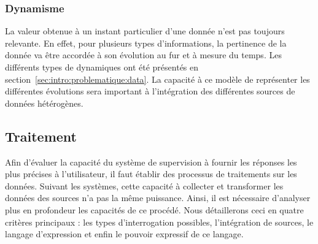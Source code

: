 \subsubsection{Dynamisme}
La valeur obtenue à un instant particulier d'une donnée n'est pas toujours relevante. En effet, pour plusieurs types d'informations, la pertinence de la donnée va être accordée à son évolution au fur et à mesure du temps. Les différents types de dynamiques ont été présentés en section~\ref{sec:intro:problematique:data}. La capacité à ce modèle de représenter les différentes évolutions sera important à l'intégration des différentes sources de données hétérogènes.

\subsection{Traitement}\label{sec:rw:supervision:criteres:traitement}
Afin d'évaluer la capacité du système de supervision à fournir les réponses les plus précises à l'utilisateur, il faut établir des processus de traitements sur les données. Suivant les systèmes, cette capacité à collecter et transformer les données des sources n'a pas la même puissance. Ainsi, il est nécessaire d'analyser plus en profondeur les capacités de ce procédé. Nous détaillerons ceci en quatre critères principaux : les types d'interrogation possibles, l'intégration de sources, le langage d'expression et enfin le pouvoir expressif de ce langage.

